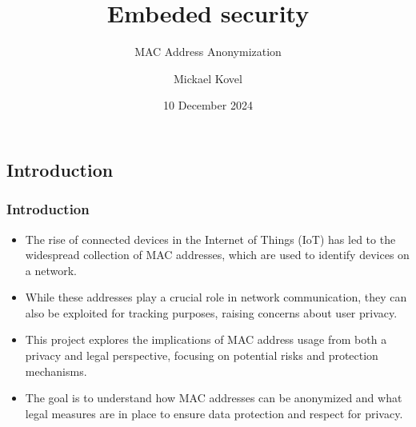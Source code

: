 \documentclass[
	11pt, %
]{beamer}
\title[Embeded]{Embeded security} %
\subtitle{MAC Address Anonymization} %
\author[Mickael Kovel]{Mickael Kovel} %
\institute[ULB]{Université Libre de Bruxelles \\ \smallskip \textit{}} %
\date[\today]{10 December 2024} %
\begin{document}
\begin{frame}
	\titlepage %
\end{frame}






\begin{frame}
  \section{Introduction}
  \frametitle{Introduction}
  \begin{itemize}
    \item The rise of connected devices in the Internet of Things (IoT) has led to the widespread collection of MAC addresses, which are used to identify devices on a network. \pause 
    \item While these addresses play a crucial role in network communication, they can also be exploited for tracking purposes, raising concerns about user privacy. \pause 
    \item This project explores the implications of MAC address usage from both a privacy and legal perspective, focusing on potential risks and protection mechanisms. \pause
    \item The goal is to understand how MAC addresses can be anonymized and what legal measures are in place to ensure data protection and respect for privacy.
  \end{itemize}
\end{frame}
\end{document}
